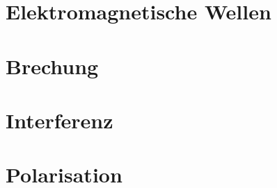 \section{Elektromagnetische Wellen} \label{sec:em_wellen}


\section{Brechung} \label{sec:brechung}


\section{Interferenz} \label{sec:interferenz_licht}


\section{Polarisation} \label{sec:polarisation}
